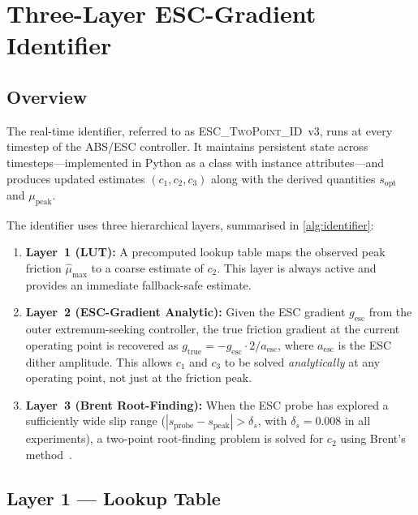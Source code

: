 \documentclass[11pt,a4paper]{article}
\newcommand{\mumax}{\mu_{\mathrm{peak}}}
\newcommand{\sopt}{s_{\mathrm{opt}}}
\begin{document}
\section{Three-Layer ESC-Gradient Identifier}
\label{sec:identifier}

\subsection{Overview}

The real-time identifier, referred to as \textsc{ESC\_TwoPoint\_ID}~v3, runs at
every timestep of the ABS/ESC controller.
It maintains persistent state across timesteps---implemented in Python as a class
with instance attributes---and produces updated estimates $(c_1, c_2, c_3)$
along with the derived quantities $\sopt$ and $\mumax$.

The identifier uses three hierarchical layers, summarised in \cref{alg:identifier}:

\begin{enumerate}
  \item \textbf{Layer~1 (LUT):} A precomputed lookup table maps the observed
        peak friction $\hat\mu_{\max}$ to a coarse estimate of $c_2$.
        This layer is always active and provides an immediate fallback-safe estimate.
  \item \textbf{Layer~2 (ESC-Gradient Analytic):} Given the ESC gradient
        $g_\mathrm{esc}$ from the outer extremum-seeking controller, the true
        friction gradient at the current operating point is recovered as
        $g_\mathrm{true} = -g_\mathrm{esc} \cdot 2 / a_\mathrm{esc}$,
        where $a_\mathrm{esc}$ is the ESC dither amplitude.
        This allows $c_1$ and $c_3$ to be solved \emph{analytically} at any
        operating point, not just at the friction peak.
  \item \textbf{Layer~3 (Brent Root-Finding):} When the ESC probe has explored
        a sufficiently wide slip range ($|s_\mathrm{probe} - s_\mathrm{peak}|
        > \delta_s$, with $\delta_s = 0.008$ in all experiments),
        a two-point root-finding problem is solved
        for $c_2$ using Brent's method~\cite{brent1973}.
\end{enumerate}

\subsection{Layer 1 --- Lookup Table}
\end{document}
